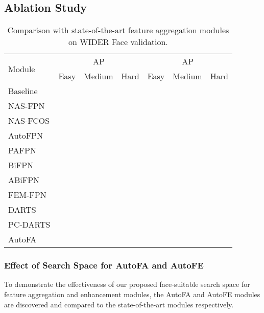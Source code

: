 \documentclass[sigconf]{acmart}
\begin{document}
\subsection{Ablation Study}

\begin{table}[!t]
    \centering
    \begin{tabular}{l|ccc|ccc}
        \toprule[1pt]
        \multirow{2}{*}{Module} & \multicolumn{3}{c|}{AP} & \multicolumn{3}{c}{AP} \\
        \cline{2-7}
        & Easy & Medium & Hard & Easy & Medium & Hard \\
        \midrule[0.5pt]
        Baseline &  &  &  &  &  &  \\
        NAS-FPN &  &  &  &  &  &  \\
        NAS-FCOS &  &  &  &  &  &  \\
        AutoFPN &  &  &  &  &  &  \\
        PAFPN &  &  &  &  &  &  \\
        BiFPN &  &  &  &  &  &  \\
        ABiFPN &  &  &  &  &  &  \\
        FEM-FPN &  &  &  &  &  &  \\
        DARTS &  &  &  &  &  &  \\
        PC-DARTS &  &  &  &  &  &  \\
        \bottomrule[0.5pt]
        AutoFA &  &  &  &  &  & \\
        \bottomrule[1pt]
    \end{tabular}
    \caption{Comparison with state-of-the-art feature aggregation modules on WIDER Face validation.}
    \label{tab:autofa}
\end{table}

\subsubsection{Effect of Search Space for AutoFA and AutoFE}
To demonstrate the effectiveness of our proposed face-suitable search space for feature aggregation and enhancement modules, the AutoFA and AutoFE modules are discovered and compared to the state-of-the-art modules respectively.
\end{document}

